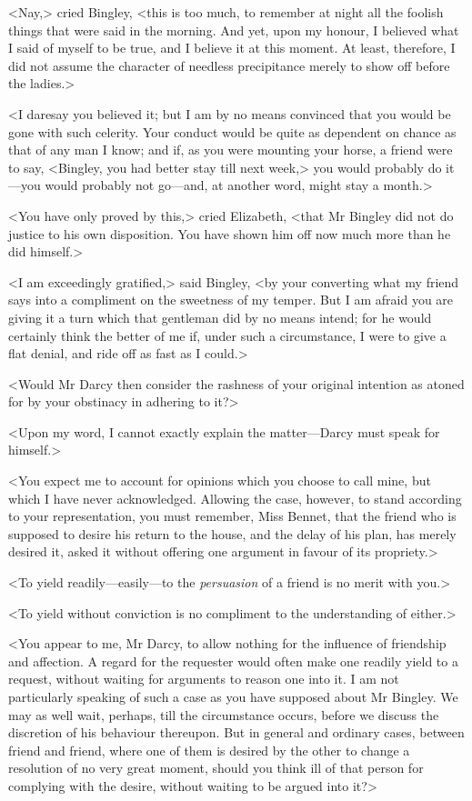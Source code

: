 <Nay,> cried Bingley, <this is too much, to remember at night all the foolish things that were said in the morning. And yet, upon my honour, I believed what I said of myself to be true, and I believe it at this moment. At least, therefore, I did not assume the character of needless precipitance merely to show off before the ladies.>

<I daresay you believed it; but I am by no means convinced that you would be gone with such celerity. Your conduct would be quite as dependent on chance as that of any man I know; and if, as you were mounting your horse, a friend were to say, <Bingley, you had better stay till next week,> you would probably do it—you would probably not go—and, at another word, might stay a month.>

<You have only proved by this,> cried Elizabeth, <that Mr Bingley did not do justice to his own disposition. You have shown him off now much more than he did himself.>

<I am exceedingly gratified,> said Bingley, <by your converting what my friend says into a compliment on the sweetness of my temper. But I am afraid you are giving it a turn which that gentleman did by no means intend; for he would certainly think the better of me if, under such a circumstance, I were to give a flat denial, and ride off as fast as I could.>

<Would Mr Darcy then consider the rashness of your original intention as atoned for by your obstinacy in adhering to it?>

<Upon my word, I cannot exactly explain the matter—Darcy must speak for himself.>

<You expect me to account for opinions which you choose to call mine, but which I have never acknowledged. Allowing the case, however, to stand according to your representation, you must remember, Miss Bennet, that the friend who is supposed to desire his return to the house, and the delay of his plan, has merely desired it, asked it without offering one argument in favour of its propriety.>

<To yield readily—easily—to the \textit{persuasion} of a friend is no merit with you.>

<To yield without conviction is no compliment to the understanding of either.>

<You appear to me, Mr Darcy, to allow nothing for the influence of friendship and affection. A regard for the requester would often make one readily yield to a request, without waiting for arguments to reason one into it. I am not particularly speaking of such a case as you have supposed about Mr Bingley. We may as well wait, perhaps, till the circumstance occurs, before we discuss the discretion of his behaviour thereupon. But in general and ordinary cases, between friend and friend, where one of them is desired by the other to change a resolution of no very great moment, should you think ill of that person for complying with the desire, without waiting to be argued into it?>

